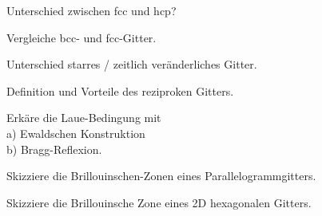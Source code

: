 \documentclass[a5paper,12pt,ngerman,print,grid=front]{kartei}
\begin{document}
	\begin{karte}{
		Unterschied zwischen fcc und hcp?
		}
		
		
		
	\end{karte}


	\begin{karte}{
		Vergleiche bcc- und fcc-Gitter.
		}
		
		
		
	\end{karte}


	\begin{karte}{
		Unterschied starres / zeitlich veränderliches Gitter.
		}
		
		
		
	\end{karte}


	\begin{karte}{
		Definition und Vorteile des reziproken Gitters.
		}
		
		
		
	\end{karte}


	\begin{karte}{
		Erkäre die Laue-Bedingung mit \\
		a) Ewaldschen Konstruktion \\
		b) Bragg-Reflexion.
		}
		
		
		
	\end{karte}


	\begin{karte}{
		Skizziere die Brillouinschen-Zonen eines Parallelogrammgitters.
		}
		
		
		
	\end{karte}


	\begin{karte}{
		Skizziere die Brillouinsche Zone eines 2D hexagonalen Gitters.
		}
		
		
		
	\end{karte}
\end{document}
